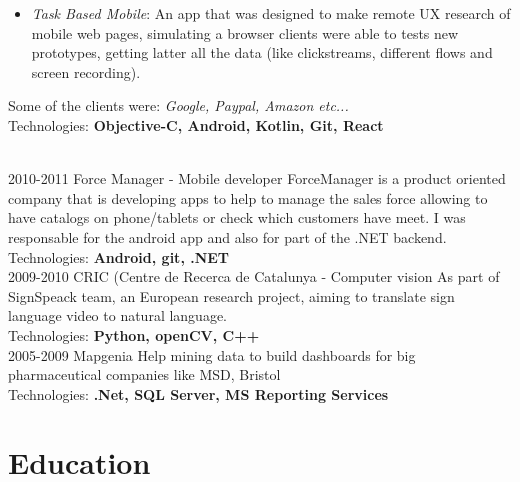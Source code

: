 \documentclass[]{friggeri-cv} %
\begin{document}
\begin{entrylist}
{\begin{itemize}
\vspace{\parsep}
\item \emph{Task Based Mobile}: An app that was designed to make remote UX
  research of mobile web pages, simulating a browser clients were able to tests
  new prototypes, getting latter all the data (like clickstreams, different
  flows and screen recording).
\vspace{\parsep}
\end{itemize}
\vspace{\parsep}
Some of the clients were: \emph{Google, Paypal, Amazon etc...}\\
\vspace{\parsep}Technologies: \textbf{Objective-C, Android, Kotlin, Git, React}
} 
\\
\entry
{2010-2011}
{Force Manager - Mobile developer}
{}
{
ForceManager is a product oriented company that is developing apps to help to
manage the sales force allowing to have catalogs on phone/tablets or check which
customers have meet. I was responsable for the android app and also for part of the .NET backend.
\\\vspace{\parsep}Technologies: \textbf{Android, git, .NET}
}
\\
\entry
{2009-2010}
{CRIC (Centre de Recerca de Catalunya - Computer vision}
{}
{
As part of SignSpeack team, an European research project, aiming to translate
sign language video to natural language.
\\\vspace{\parsep}Technologies: \textbf{Python, openCV, C++}
}
\\
\entry
{2005-2009}
{Mapgenia}
{}
{
Help mining data to build dashboards for big pharmaceutical companies like MSD, Bristol
\\\vspace{\parsep}Technologies: \textbf{.Net, SQL Server, MS Reporting Services}
}
\end{entrylist}


\section{Education}
\end{document}
